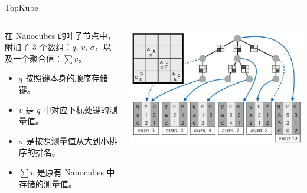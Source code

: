 \documentclass[10pt,aspectratio=169]{beamer}
\begin{document}
\begin{frame}{TopKube}
    \begin{columns}
        \begin{column}{.6\textwidth}
            在 Nanocubes 的叶子节点中，附加了 3 个数组：$q$, $v$, $\sigma$，以及一个聚合值：$\sum v$。
            \begin{itemize}
                \item $q$ 按照键本身的顺序存储键。
                \item $v$ 是 $q$ 中对应下标处键的测量值。
                \item $\sigma$ 是按照测量值从大到小排序的排名。
                \item $\sum v$ 是原有 Nanocubes 中存储的测量值。
            \end{itemize}
        \end{column}
        \begin{column}{.4\textwidth}
            \includegraphics[width=\textwidth]{pic/topkube.jpg}
        \end{column}
    \end{columns}
\end{frame}
\end{document}
